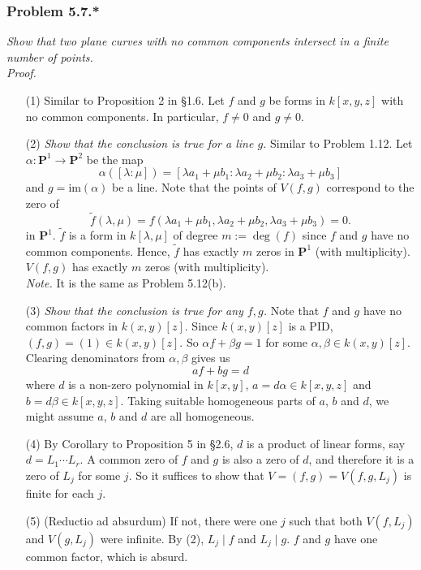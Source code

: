 \documentclass{article}
\begin{document}



\subsubsection*{Problem 5.7.*}
\emph{Show that two plane curves with no common components intersect in
a finite number of points.} \\



\emph{Proof.}
\begin{enumerate}
\item[(1)]
  Similar to Proposition 2 in \S 1.6.
  Let $f$ and $g$ be forms in $k[x,y,z]$ with no common components.
  In particular, $f \neq 0$ and $g \neq 0$.

\item[(2)]
  \emph{Show that the conclusion is true for a line $g$.}
  Similar to Problem 1.12.
  Let
  $\alpha: \mathbf{P}^1 \to \mathbf{P}^2$ be the map
  \[
    \alpha([\lambda : \mu]) = [\lambda a_1 + \mu b_1 : \lambda a_2 + \mu b_2 : \lambda a_3 + \mu b_3]
  \]
  and $g = \mathrm{im}(\alpha)$ be a line.
  Note that the points of $V(f, g)$ correspond to the zero of
  \[
    \widetilde{f}(\lambda, \mu)
    = f(\lambda a_1 + \mu b_1, \lambda a_2 + \mu b_2, \lambda a_3 + \mu b_3)
    = 0.
  \]
  in $\mathbf{P}^1$.
  $\widetilde{f}$ is a form in $k[\lambda,\mu]$ of degree $m := \deg(f)$
  since $f$ and $g$ have no common components.
  Hence, $\widetilde{f}$ has exactly $m$ zeros in $\mathbf{P}^1$ (with multiplicity).
  $V(f,g)$ has exactly $m$ zeros (with multiplicity). \\

  \emph{Note.} It is the same as Problem 5.12(b).

\item[(3)]
  \emph{Show that the conclusion is true for any $f, g$.}
  Note that $f$ and $g$ have no common factors in $k(x,y)[z]$.
  Since $k(x,y)[z]$ is a PID, $(f,g) = (1) \in k(x,y)[z]$.
  So $\alpha f + \beta g = 1$ for some $\alpha, \beta \in k(x,y)[z]$.
  Clearing denominators from $\alpha, \beta$ gives us
  \[
    af + bg = d
  \]
  where $d$ is a non-zero polynomial in $k[x,y]$,
  $a = d\alpha \in k[x,y,z]$ and $b = d\beta \in k[x,y,z]$.
  Taking suitable homogeneous parts of $a$, $b$ and $d$,
  we might assume $a$, $b$ and $d$ are all homogeneous.

\item[(4)]
  By Corollary to Proposition 5 in \S 2.6,
  $d$ is a product of linear forms, say $d = L_1 \cdots L_r$.
  A common zero of $f$ and $g$ is also a zero of $d$,
  and therefore it is a zero of $L_j$ for some $j$.
  So it suffices to show that $V = (f,g) = V(f,g,L_j)$ is finite for each $j$.

\item[(5)]
  (Reductio ad absurdum)
  If not, there were one $j$ such that both $V(f,L_j)$ and $V(g,L_j)$ were infinite.
  By (2), $L_j \mid f$ and $L_j \mid g$.
  $f$ and $g$ have one common factor, which is absurd.
\end{enumerate}
\end{document}
